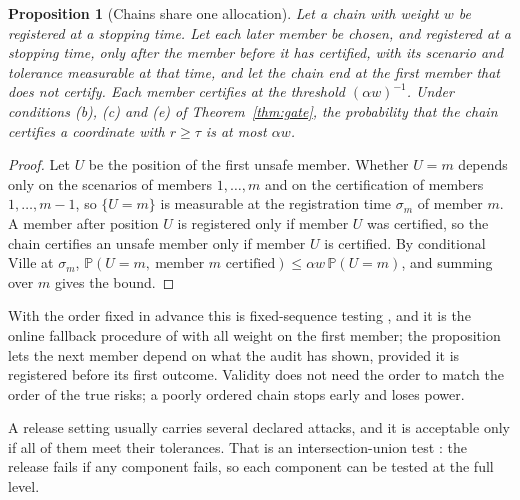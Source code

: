 \documentclass{jpc}
\newtheorem{proposition}[thm]{Proposition}
\theoremstyle{remark}
\newcommand{\Prob}{\mathbb P}
\begin{document}
\begin{proposition}[Chains share one allocation]\label{prop:chain}
Let a chain with weight $w$ be registered at a stopping time. Let each later member be chosen, and registered at a stopping time, only after the member before it has certified, with its scenario and tolerance measurable at that time, and let the chain end at the first member that does not certify. Each member certifies at the threshold $(\alpha w)^{-1}$. Under conditions (b), (c) and (e) of Theorem~\ref{thm:gate}, the probability that the chain certifies a coordinate with $r\ge\tau$ is at most $\alpha w$.
\end{proposition}
\begin{proof}
Let $U$ be the position of the first unsafe member. Whether $U=m$ depends only on the scenarios of members $1,\ldots,m$ and on the certification of members $1,\ldots,m-1$, so $\{U=m\}$ is measurable at the registration time $\sigma_m$ of member $m$. A member after position $U$ is registered only if member $U$ was certified, so the chain certifies an unsafe member only if member $U$ is certified. By conditional Ville at $\sigma_m$, $\Prob(U=m,\ \text{member } m\text{ certified})\le\alpha w\,\Prob(U=m)$, and summing over $m$ gives the bound.
\end{proof}
With the order fixed in advance this is fixed-sequence testing \cite{maurer1995}, and it is the online fallback procedure of \cite{tian2021} with all weight on the first member; the proposition lets the next member depend on what the audit has shown, provided it is registered before its first outcome. Validity does not need the order to match the order of the true risks; a poorly ordered chain stops early and loses power.

A release setting usually carries several declared attacks, and it is acceptable only if all of them meet their tolerances. That is an intersection-union test \cite{berger1982}: the release fails if any component fails, so each component can be tested at the full level.
\end{document}
